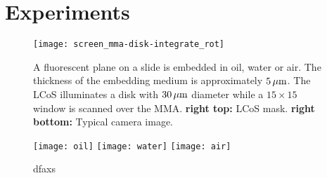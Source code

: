 \chapter{Experiments}


\begin{figure}[!hbt]
  \centering
   
  \texttt{[image: screen\_mma-disk-integrate\_rot]}
  \caption{A fluorescent plane on a slide is embedded in oil, water or
    air. The thickness of the embedding medium is approximately
    $\unit[5]{\mu m}$. The LCoS illuminates a disk with $\unit[30]{\mu
      m}$ diameter while a $15\times 15$ window is scanned over the
    MMA. {\bf right top:} LCoS mask. {\bf right bottom:} Typical
    camera image.}
  \label{fig:tirf-exp}
\end{figure}


\begin{figure}[!hbt]
  \centering
  \texttt{[image: oil]}
  \texttt{[image: water]}
  \texttt{[image: air]}
  \caption{dfaxs}
  \label{fig:immersion-bfp-scan}
\end{figure}
